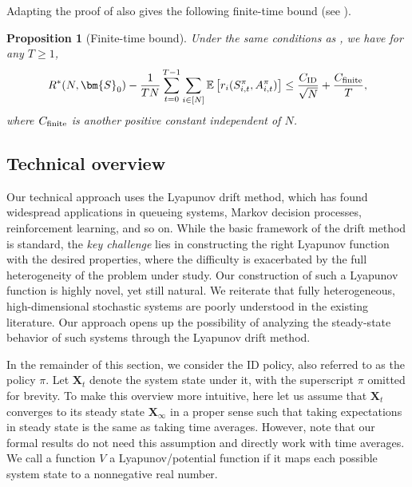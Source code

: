 \documentclass{article}
\theoremstyle{plain}
\newtheorem{proposition}{Proposition}
\theoremstyle{remark}
\newcommand{\E}[1]{\mathbb{E}\left[#1\right]}
\newcommand{\ID}{\textnormal{ID}}
\newcommand{\finite}{\textnormal{finite}}
\def\mX{{\bm{X}}}
\begin{document}
Adapting the proof of  also gives the following finite-time bound (see ). 

\begin{proposition}[Finite-time bound]
    \label{prop:finite-time-bound}
    Under the same conditions as , we have for any $T\ge 1$,
    \begin{equation}
        R^*(N, \bm{S}_0) - \frac{1}{TN}\sum_{t=0}^{T-1}\sum_{i\in[N]}\E{r_i(S_{i,t}^\pi, A_{i,t}^\pi)} \leq \frac{C_\ID}{\sqrt{N}} + \frac{C_\finite}{T},
    \end{equation}
    where $C_\finite$ is another positive constant independent of $N$. 
\end{proposition}




\subsection*{Technical overview}

Our technical approach uses the Lyapunov drift method, which has found widespread applications in queueing systems, Markov decision processes, reinforcement learning, and so on.
While the basic framework of the drift method is standard, the \emph{key challenge} lies in constructing the right Lyapunov function with the desired properties, where the difficulty is exacerbated by the full heterogeneity of the problem under study.
Our construction of such a Lyapunov function is highly novel, yet still natural.
We reiterate that fully heterogeneous, high-dimensional stochastic systems are poorly understood in the existing literature.
Our approach opens up the possibility of analyzing the steady-state behavior of such systems through the Lyapunov drift method.


In the remainder of this section, we consider the ID policy, also referred to as the policy $\pi$.
Let $\mX_t$ denote the system state under it, with the superscript $\pi$ omitted for brevity.
To make this overview more intuitive, here let us assume that $\mX_t$ converges to its steady state $\mX_{\infty}$ in a proper sense such that taking expectations in steady state is the same as taking time averages.
However, note that our formal results do not need this assumption and directly work with time averages.
We call a function $V$ a Lyapunov/potential function if it maps each possible system state to a nonnegative real number.
\end{document}
